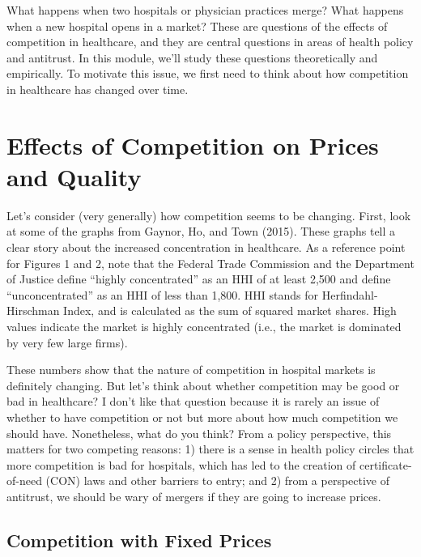 \documentclass[
  letterpaper,
  DIV=11,
  numbers=noendperiod]{scrreport}
\theoremstyle{definition}
\theoremstyle{remark}
\begin{document}
What happens when two hospitals or physician practices merge? What
happens when a new hospital opens in a market? These are questions of
the effects of competition in healthcare, and they are central questions
in areas of health policy and antitrust. In this module, we'll study
these questions theoretically and empirically. To motivate this issue,
we first need to think about how competition in healthcare has changed
over time.

\hypertarget{effects-of-competition-on-prices-and-quality}{%
\section{Effects of Competition on Prices and
Quality}\label{effects-of-competition-on-prices-and-quality}}

Let's consider (very generally) how competition seems to be changing.
First, look at some of the graphs from Gaynor, Ho, and Town (2015).
These graphs tell a clear story about the increased concentration in
healthcare. As a reference point for Figures 1 and 2, note that the
Federal Trade Commission and the Department of Justice define ``highly
concentrated'' as an HHI of at least 2,500 and define ``unconcentrated''
as an HHI of less than 1,800. HHI stands for Herfindahl-Hirschman Index,
and is calculated as the sum of squared market shares. High values
indicate the market is highly concentrated (i.e., the market is
dominated by very few large firms).

These numbers show that the nature of competition in hospital markets is
definitely changing. But let's think about whether competition may be
good or bad in healthcare? I don't like that question because it is
rarely an issue of whether to have competition or not but more about how
much competition we should have. Nonetheless, what do you think? From a
policy perspective, this matters for two competing reasons: 1) there is
a sense in health policy circles that more competition is bad for
hospitals, which has led to the creation of certificate-of-need (CON)
laws and other barriers to entry; and 2) from a perspective of
antitrust, we should be wary of mergers if they are going to increase
prices.

\hypertarget{competition-with-fixed-prices}{%
\subsection{Competition with Fixed
Prices}\label{competition-with-fixed-prices}}
\end{document}

